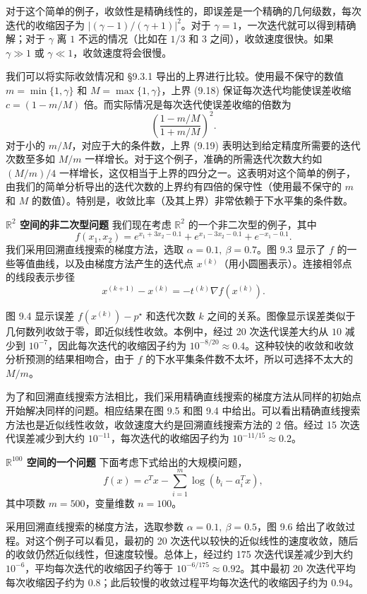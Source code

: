 \documentclass[UTF8, 12pt, fontset=fandol, oneside]{ctexart}
\begin{document}
对于这个简单的例子，收敛性是精确线性的，即误差是一个精确的几何级数，每次迭代的收缩因子为 $|(\gamma-1)/(\gamma+1)|^2$。对于 $\gamma=1$，一次迭代就可以得到精确解；对于 $\gamma$ 离 $1$ 不远的情况（比如在 $1/3$ 和 $3$ 之间），收敛速度很快。如果 $\gamma\gg1$ 或 $\gamma\ll1$，收敛速度将会很慢。

我们可以将实际收敛情况和 \S9.3.1 导出的上界进行比较。使用最不保守的数值 $m=\min\{1,\gamma\}$ 和 $M=\max\{1,\gamma\}$，上界 (9.18) 保证每次迭代均能使误差收缩 $c=(1-m/M)$ 倍。而实际情况是每次迭代使误差收缩的倍数为
\[
\left(\frac{1-m/M}{1+m/M}\right)^2.
\]
对于小的 $m/M$，对应于大的条件数，上界 (9.19) 表明达到给定精度所需要的迭代次数至多如 $M/m$ 一样增长。对于这个例子，准确的所需迭代次数大约如 $(M/m)/4$ 一样增长，这仅相当于上界的四分之一。这表明对这个简单的例子，由我们的简单分析导出的迭代次数的上界约有四倍的保守性（使用最不保守的 $m$ 和 $M$ 的数值）。特别是，收敛比率（及其上界）非常依赖于下水平集的条件数。

\noindent\textbf{$\mathbb{R}^2$ 空间的非二次型问题}\quad
我们现在考虑 $\mathbb{R}^2$ 的一个非二次型的例子，其中
\begin{equation}
f(x_1,x_2)=e^{x_1+3x_2-0.1}+e^{x_1-3x_2-0.1}+e^{-x_1-0.1}.
\tag{9.20}
\end{equation}
我们采用回溯直线搜索的梯度方法，选取 $\alpha=0.1,\ \beta=0.7$。图 9.3 显示了 $f$ 的一些等值曲线，以及由梯度方法产生的迭代点 $x^{(k)}$（用小圆圈表示）。连接相邻点的线段表示步径
\[
x^{(k+1)}-x^{(k)}=-t^{(k)}\nabla f(x^{(k)}).
\]

图 9.4 显示误差 $f(x^{(k)})-p^\star$ 和迭代次数 $k$ 之间的关系。图像显示误差类似于几何数列收敛于零，即近似线性收敛。本例中，经过 20 次迭代误差大约从 $10$ 减少到 $10^{-7}$，因此每次迭代的收缩因子约为 $10^{-8/20}\approx0.4$。这种较快的收敛和收敛分析预测的结果相吻合，由于 $f$ 的下水平集条件数不太坏，所以可选择不太大的 $M/m$。

为了和回溯直线搜索方法相比，我们采用精确直线搜索的梯度方法从同样的初始点开始解决同样的问题。相应结果在图 9.5 和图 9.4 中给出。可以看出精确直线搜索方法也是近似线性收敛，收敛速度大约是回溯直线搜索方法的 2 倍。经过 15 次迭代误差减少到大约 $10^{-11}$，每次迭代的收缩因子约为 $10^{-11/15}\approx0.2$。

\noindent\textbf{$\mathbb{R}^{100}$ 空间的一个问题}\quad
下面考虑下式给出的大规模问题，
\begin{equation}
f(x)=c^Tx-\sum_{i=1}^m\log(b_i-a_i^Tx),
\tag{9.21}
\end{equation}
其中项数 $m=500$，变量维数 $n=100$。

采用回溯直线搜索的梯度方法，选取参数 $\alpha=0.1,\ \beta=0.5$，图 9.6 给出了收敛过程。对这个例子可以看见，最初的 20 次迭代以较快的近似线性的速度收敛，随后的收敛仍然近似线性，但速度较慢。总体上，经过约 175 次迭代误差减少到大约 $10^{-6}$，平均每次迭代的收缩因子约等于 $10^{-6/175}\approx0.92$。其中最初 20 次迭代平均每次收缩因子约为 $0.8$；此后较慢的收敛过程平均每次迭代的收缩因子约为 $0.94$。
\end{document}
